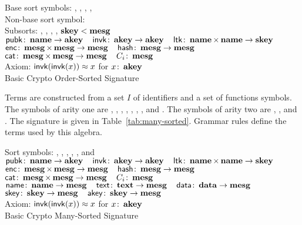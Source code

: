 \documentclass[12pt]{report}
\theoremstyle{definition}
\begin{document}
\begin{table}
\begin{center}
Base sort symbols: , , , ,
\\
Non-base sort symbol:  \\[1ex]
Subsorts: , , , ,
$\dom{skey}<\dom{mesg}$\\[1ex]
$\cn{pubk}\colon\dom{name}\rightarrow\dom{akey}\quad
\cn{invk}\colon\dom{akey}\rightarrow\dom{akey}\quad
\cn{ltk}\colon\dom{name}\times\dom{name}\rightarrow\dom{skey}$\\
$\cn{enc}\colon\dom{mesg}
\times\dom{mesg}\rightarrow\dom{mesg}\quad
\cn{hash}\colon\dom{mesg}\rightarrow\dom{mesg}$\\
$\cn{cat}\colon\dom{mesg}
\times\dom{mesg}\rightarrow\dom{mesg}\quad C_i\colon\dom{mesg}$\\[1ex]
Axiom: $\cn{invk}(\cn{invk}(x))\approx x$ for $x\colon\dom{akey}$\\
\caption{Basic Crypto Order-Sorted Signature}\label{tab:order-sorted}
\end{center}
\end{table}

Terms are constructed from a set $I$ of identifiers
and a set of functions symbols.  The symbols of arity one are
, , , , , ,
, and .  The symbols of arity two are ,
, and .  The signature is given in
Table~\ref{tab:many-sorted}.  Grammar rules define the terms used by
this algebra.

\begin{table}
\begin{center}
Sort symbols: , , ,
, , and \\[1ex]
$\cn{pubk}\colon\dom{name}\rightarrow\dom{akey}\quad
\cn{invk}\colon\dom{akey}\rightarrow\dom{akey}\quad
\cn{ltk}\colon\dom{name}\times\dom{name}\rightarrow\dom{skey}$\\
$\cn{enc}\colon\dom{mesg}
\times\dom{mesg}\rightarrow\dom{mesg}\quad
\cn{hash}\colon\dom{mesg}
\rightarrow\dom{mesg}$\\
$\cn{cat}\colon\dom{mesg}
\times\dom{mesg}\rightarrow\dom{mesg}\quad C_i\colon\dom{mesg}$\\
$\cn{name}\colon\dom{name}\rightarrow\dom{mesg}\quad
\cn{text}\colon\dom{text}\rightarrow\dom{mesg}\quad
\cn{data}\colon\dom{data}\rightarrow\dom{mesg}$\\
$\cn{skey}\colon\dom{skey}\rightarrow\dom{mesg}\quad
\cn{akey}\colon\dom{skey}\rightarrow\dom{mesg}$\\[1ex]
Axiom: $\cn{invk}(\cn{invk}(x))\approx x$ for $x\colon\dom{akey}$\\
\caption{Basic Crypto Many-Sorted Signature}\label{tab:many-sorted}
\end{center}
\end{table}
\end{document}
